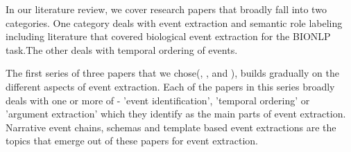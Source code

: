 In our literature review, we cover research papers that broadly fall into two categories. One category deals with event extraction and semantic role labeling including literature that covered biological event extraction for the BIONLP task.The other deals with temporal ordering of events.

The first series of three papers that we chose(\citeauthor{chju2008ec}, \citeauthor{chju2009}, and \citeauthor{chju2011}), builds gradually on the different aspects of event extraction. Each of the papers in this series broadly deals with one or more of - 'event identification', 'temporal ordering' or 'argument extraction' which they identify as the main parts of event extraction. Narrative event chains, schemas and template based event extractions are the topics that emerge out of these papers for event extraction.

